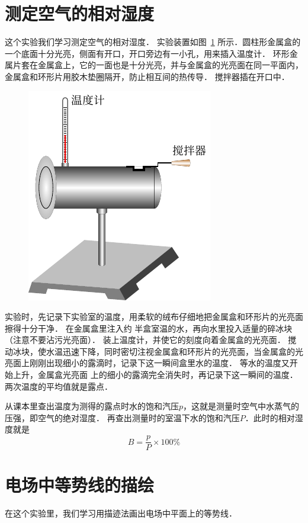 \section{测定空气的相对湿度}
这个实验我们学习测定空气的相对湿度．
实验装置如图~\ref{fig_B_9-4} 所示．圆柱形金属盒的一个底面十分光亮，侧面有开口，开口旁边有一小孔，用来插入温度计．
环形金属片套在金属盒上，它的一面也是十分光亮，并与金属盒的光亮面在同一平面内，金属盒和环形片用胶木垫圈隔开，防止相互间的热传导．
搅拌器插在开口中．
\begin{figure}[htbp]
    \centering
    \includegraphics{fig/B/9-4.pdf}
    \caption{}\label{fig_B_9-4}
\end{figure}

实验时，先记录下实验室的温度，用柔软的绒布仔细地把金属盒和环形片的光亮面擦得十分干净．
在金属盒里注入约
半盒室温的水，再向水里投入适量的碎冰块（注意不要沾污光亮面）．
装上温度计，并使它的刻度向着金属盒的光亮面．
搅动冰块，使水温迅速下降，同时密切注视金属盒和环形片的光亮面，当金属盒的光亮面上刚刚出现细小的露滴时，记录下这一瞬间盒里水的温度．
等水的温度又开始上升，金属盒光亮面
上的细小的露滴完全消失时，再记录下这一瞬间的温度．
两次温度的平均值就是露点．

从课本里查出温度为测得的露点时水的饱和汽压$p$，这就是测量时空气中水蒸气的压强，即空气的绝对湿度．
再查出测量时的室温下水的饱和汽压$P$．此时的相对湿度就是
\[B=\frac{p}{P}\times 100\%\]

\section{电场中等势线的描绘}
在这个实验里，我们学习用描迹法画出电场中平面上的等势线．

